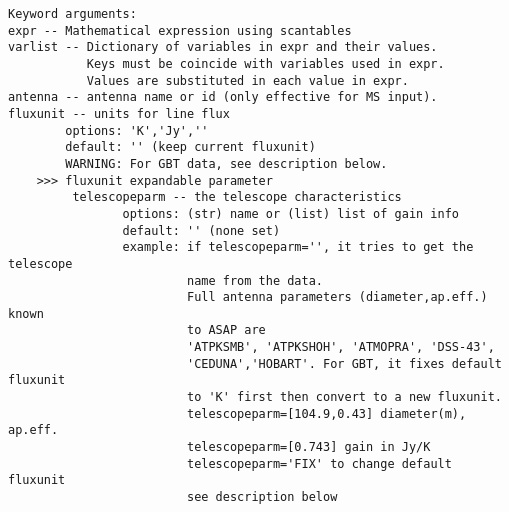 \begin{verbatim}
Keyword arguments:
expr -- Mathematical expression using scantables 
varlist -- Dictionary of variables in expr and their values.
           Keys must be coincide with variables used in expr.
           Values are substituted in each value in expr.
antenna -- antenna name or id (only effective for MS input). 
fluxunit -- units for line flux
        options: 'K','Jy',''
        default: '' (keep current fluxunit)
        WARNING: For GBT data, see description below.
    >>> fluxunit expandable parameter
         telescopeparm -- the telescope characteristics
                options: (str) name or (list) list of gain info
                default: '' (none set)
                example: if telescopeparm='', it tries to get the telescope
                         name from the data.
                         Full antenna parameters (diameter,ap.eff.) known
                         to ASAP are
                         'ATPKSMB', 'ATPKSHOH', 'ATMOPRA', 'DSS-43',
                         'CEDUNA','HOBART'. For GBT, it fixes default fluxunit
                         to 'K' first then convert to a new fluxunit.
                         telescopeparm=[104.9,0.43] diameter(m), ap.eff.
                         telescopeparm=[0.743] gain in Jy/K
                         telescopeparm='FIX' to change default fluxunit
                         see description below


\end{verbatim}
